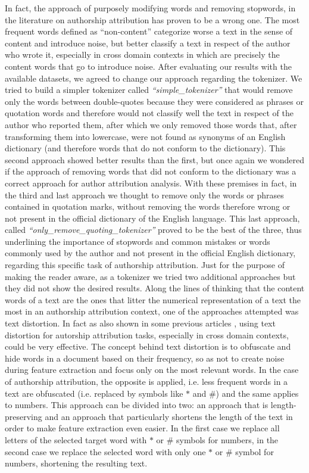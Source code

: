 In fact, the approach of purposely modifying words and removing stopwords, in the literature on authorship attribution has proven to be a wrong one. The most frequent words defined as \enquote{non-content} categorize worse a text in the sense of content and introduce noise, but better classify a text in respect of the author who wrote it, especially in cross domain contexts in which are precisely the content words that go to introduce noise.
After evaluating our results with the available datasets, we agreed to change our approach regarding the tokenizer. We tried to build a simpler tokenizer called \textit{\enquote{simple\_tokenizer}} that would remove only the words between double-quotes because they were considered as phrases or quotation words and therefore would not classify well the text in respect of the author who reported them, after which we only removed those words that, after transforming them into lowercase, were not found as synonyms of an English dictionary (and therefore words that do not conform to the dictionary). This second approach showed better results than the first, but once again we wondered if the approach of removing words that did not conform to the dictionary was a correct approach for author attribution analysis. With these premises in fact, in the third and last approach we thought to remove only the words or phrases contained in quotation marks, without removing the words therefore wrong or not present in the official dictionary of the English language. This last approach, called \textit{\enquote{only\_remove\_quoting\_tokenizer}} proved to be the best of the three, thus underlining the importance of stopwords and common mistakes or words commonly used by the author and not present in the official English dictionary, regarding this specific task of authorship attribution.
Just for the purpose of making the reader aware, as a tokenizer we tried two additional approaches but they did not show the desired results.  Along the lines of thinking that the content words of a text are the ones that litter the numerical representation of a text the most in an authorship attribution context, one of the approaches attempted was text distortion. In fact as also shown in some previous articles \cite{stamatatos2017authorship}, using text distortion for autorship attribution tasks, especially in cross domain contexts, could be very effective. The concept behind text distortion is to obfuscate and hide words in a document based on their frequency, so as not to create noise during feature extraction and focus only on the most relevant words. In the case of authorship attribution, the opposite is applied, i.e. less frequent words in a text are obfuscated (i.e. replaced by symbols like $ * $ and $ \# $) and the same applies to numbers. This approach can be divided into two: an approach that is length-preserving and an approach that particularly shortens the length of the text in order to make feature extraction even easier. In the first case we replace all letters of the selected target word with $ * $ or $ \# $ symbols for numbers, in the second case we replace the selected word with only one $ * $ or $ \# $ symbol for numbers, shortening the resulting text.
